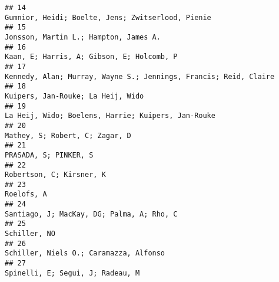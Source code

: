 \documentclass[
  english,
  man]{apa6}
\begin{document}
\begin{verbatim}
## 14                                                                                                                                         Gumnior, Heidi; Boelte, Jens; Zwitserlood, Pienie
## 15                                                                                                                                                     Jonsson, Martin L.; Hampton, James A.
## 16                                                                                                                                                 Kaan, E; Harris, A; Gibson, E; Holcomb, P
## 17                                                                                                                          Kennedy, Alan; Murray, Wayne S.; Jennings, Francis; Reid, Claire
## 18                                                                                                                                                         Kuipers, Jan-Rouke; La Heij, Wido
## 19                                                                                                                                        La Heij, Wido; Boelens, Harrie; Kuipers, Jan-Rouke
## 20                                                                                                                                                            Mathey, S; Robert, C; Zagar, D
## 21                                                                                                                                                                     PRASADA, S; PINKER, S
## 22                                                                                                                                                                  Robertson, C; Kirsner, K
## 23                                                                                                                                                                                Roelofs, A
## 24                                                                                                                                                 Santiago, J; MacKay, DG; Palma, A; Rho, C
## 25                                                                                                                                                                              Schiller, NO
## 26                                                                                                                                                    Schiller, Niels O.; Caramazza, Alfonso
## 27                                                                                                                                                          Spinelli, E; Segui, J; Radeau, M

\end{verbatim}
\end{document}

